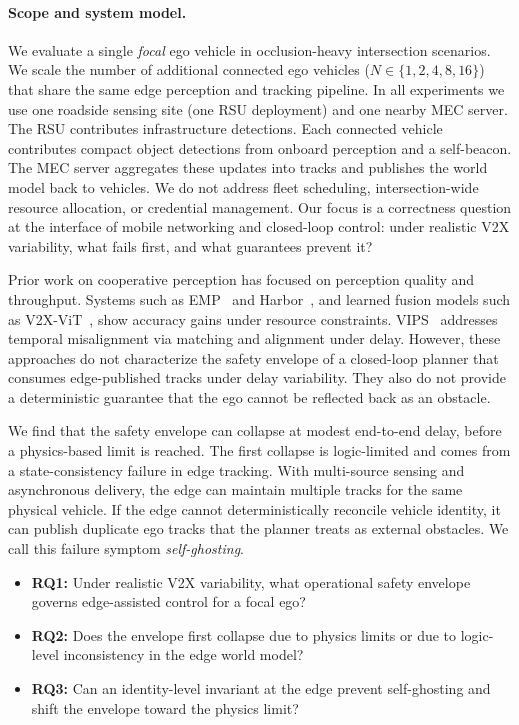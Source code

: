\paragraph{Scope and system model.}
We evaluate a single \emph{focal} ego vehicle in occlusion-heavy intersection scenarios. We scale the number of additional connected ego vehicles ($N \in \{1,2,4,8,16\}$) that share the same edge perception and tracking pipeline.
In all experiments we use one roadside sensing site (one RSU deployment) and one nearby MEC server. The RSU contributes infrastructure detections.
Each connected vehicle contributes compact object detections from onboard perception and a self-beacon.
The MEC server aggregates these updates into tracks and publishes the world model back to vehicles.
We do not address fleet scheduling, intersection-wide resource allocation, or credential management.
Our focus is a correctness question at the interface of mobile networking and closed-loop control: under realistic V2X variability, what fails first, and what guarantees prevent it?

Prior work on cooperative perception has focused on perception quality and throughput. Systems such as EMP~\cite{EMP} and Harbor~\cite{harbor}, and learned fusion models such as V2X-ViT~\cite{v2xvit2022}, show accuracy gains under resource constraints. VIPS~\cite{vips2022} addresses temporal misalignment via matching and alignment under delay. However, these approaches do not characterize the safety envelope of a closed-loop planner that consumes edge-published tracks under delay variability. They also do not provide a deterministic guarantee that the ego cannot be reflected back as an obstacle.

We find that the safety envelope can collapse at modest end-to-end delay, before a physics-based limit is reached. The first collapse is logic-limited and comes from a state-consistency failure in edge tracking.
With multi-source sensing and asynchronous delivery, the edge can maintain multiple tracks for the same physical vehicle. If the edge cannot deterministically reconcile vehicle identity, it can publish duplicate ego tracks that the planner treats as external obstacles. 
We call this failure symptom \emph{self-ghosting}.

\begin{tcolorbox}[title=Research Questions]
\begin{itemize}[noitemsep,topsep=0pt,leftmargin=2mm]
  \item \textbf{RQ1:} Under realistic V2X variability, what operational safety envelope governs edge-assisted control for a focal ego?
  \item \textbf{RQ2:} Does the envelope first collapse due to physics limits or due to logic-level inconsistency in the edge world model?
  \item \textbf{RQ3:} Can an identity-level invariant at the edge prevent self-ghosting and shift the envelope toward the physics limit?
\end{itemize}
\end{tcolorbox}


